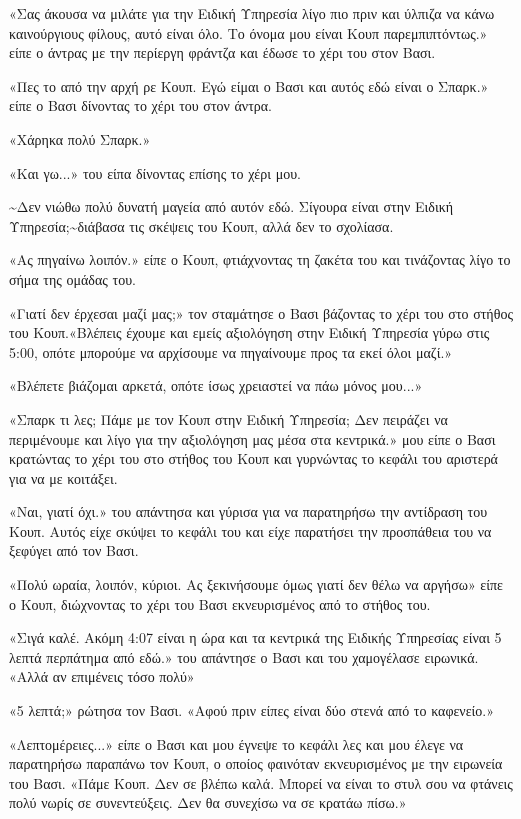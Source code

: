 \documentclass[12pt,twoside, openany]{book}
\begin{document}
«Σας άκουσα να μιλάτε για την Ειδική Υπηρεσία λίγο πιο πριν και ύλπιζα να κάνω καινούργιους φίλους, αυτό είναι όλο. Το όνομα μου είναι Κουπ παρεμπιπτόντως.» είπε ο άντρας με την περίεργη φράντζα και έδωσε το χέρι του στον Βασι.

«Πες το από την αρχή ρε Κουπ. Εγώ είμαι ο Βασι και αυτός εδώ είναι ο Σπαρκ.» είπε ο Βασι δίνοντας το χέρι του στον άντρα.

«Χάρηκα πολύ Σπαρκ.»

«Και γω...» του είπα δίνοντας επίσης το χέρι μου.

\textasciitilde Δεν νιώθω πολύ δυνατή μαγεία από αυτόν εδώ. Σίγουρα είναι στην Ειδική Υπηρεσία;\textasciitilde  διάβασα τις σκέψεις του Κουπ, αλλά δεν το σχολίασα.

«Ας πηγαίνω λοιπόν.» είπε ο Κουπ, φτιάχνοντας τη ζακέτα του και τινάζοντας λίγο το σήμα της ομάδας του.

«Γιατί δεν έρχεσαι μαζί μας;» τον σταμάτησε ο Βασι βάζοντας το χέρι του στο στήθος του Κουπ.«Βλέπεις έχουμε και εμείς αξιολόγηση στην Ειδική Υπηρεσία γύρω στις 5:00, οπότε μπορούμε να αρχίσουμε να πηγαίνουμε προς τα εκεί όλοι μαζί.»

«Βλέπετε βιάζομαι αρκετά, οπότε ίσως χρειαστεί να πάω μόνος μου...»

«Σπαρκ τι λες; Πάμε με τον Κουπ στην Ειδική Υπηρεσία; Δεν πειράζει να περιμένουμε και λίγο για την αξιολόγηση μας μέσα στα κεντρικά.» μου είπε ο Βασι κρατώντας το χέρι του στο στήθος του Κουπ και γυρνώντας το κεφάλι του αριστερά για να με κοιτάξει.

«Ναι, γιατί όχι.» του απάντησα και γύρισα για να παρατηρήσω την αντίδραση του Κουπ. Αυτός είχε σκύψει το κεφάλι του και είχε παρατήσει την προσπάθεια του να ξεφύγει από τον Βασι.

«Πολύ ωραία, λοιπόν, κύριοι.  Ας ξεκινήσουμε όμως γιατί δεν θέλω να αργήσω» είπε ο Κουπ, διώχνοντας το χέρι του Βασι εκνευρισμένος από το στήθος του.

«Σιγά καλέ. Ακόμη 4:07 είναι η ώρα και τα κεντρικά της Ειδικής Υπηρεσίας είναι 5 λεπτά περπάτημα από εδώ.» του απάντησε ο Βασι και του χαμογέλασε ειρωνικά. «Αλλά αν επιμένεις τόσο πολύ»

«5 λεπτά;» ρώτησα τον Βασι. «Αφού πριν είπες είναι δύο στενά από το καφενείο.»

«Λεπτομέρειες...» είπε ο Βασι και μου έγνεψε το κεφάλι λες και μου έλεγε να παρατηρήσω παραπάνω τον Κουπ, ο οποίος φαινόταν εκνευρισμένος με την ειρωνεία του Βασι. «Πάμε Κουπ. Δεν σε βλέπω καλά. Μπορεί να είναι το στυλ σου να φτάνεις πολύ νωρίς σε συνεντεύξεις. Δεν θα συνεχίσω να σε κρατάω πίσω.»
\end{document}
